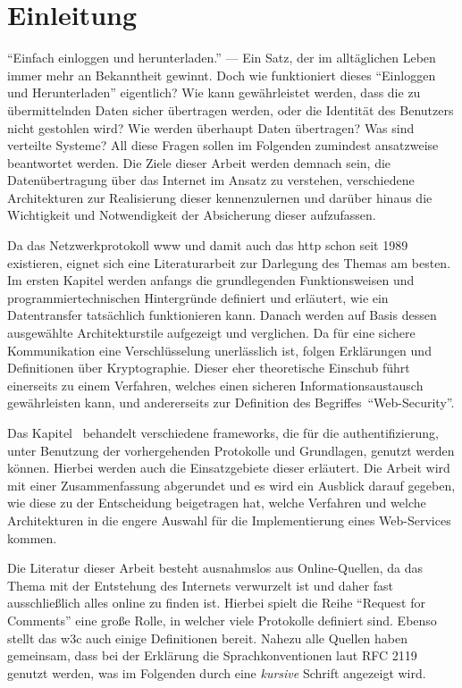 \section{Einleitung}\label{sec:einleitung}

	\enquote{Einfach einloggen und herunterladen.}
	--- Ein Satz, der im alltäglichen Leben immer mehr an Bekanntheit gewinnt.
	Doch wie funktioniert dieses \enquote{Einloggen und Herunterladen} eigentlich?
	Wie kann gewährleistet werden,
	dass die zu übermittelnden Daten sicher übertragen werden,
	oder die Identität des Benutzers nicht gestohlen wird?
	Wie werden überhaupt Daten übertragen?
	Was sind verteilte Systeme?
	All diese Fragen sollen im Folgenden zumindest ansatzweise beantwortet werden.
	Die Ziele dieser Arbeit werden demnach sein,
	die Datenübertragung über das Internet im Ansatz zu verstehen,
	verschiedene Architekturen zur Realisierung dieser kennenzulernen
	und darüber hinaus die Wichtigkeit und Notwendigkeit der Absicherung dieser aufzufassen.

	Da das Netzwerkprotokoll \gls{www} und damit auch das \gls{http} schon seit 1989 existieren,
	eignet sich eine Literaturarbeit zur Darlegung des Themas am besten.
	Im ersten Kapitel werden anfangs die grundlegenden Funktionsweisen
	und programmiertechnischen Hintergründe definiert
	und erläutert,
	wie ein Datentransfer tatsächlich funktionieren kann.
	Danach werden auf Basis dessen ausgewählte Architekturstile aufgezeigt und verglichen.
	Da für eine sichere Kommunikation eine Verschlüsselung unerlässlich ist,
	folgen Erklärungen und Definitionen über Kryptographie.
	Dieser eher theoretische Einschub führt einerseits zu einem Verfahren,
	welches einen sicheren Informationsaustausch gewährleisten kann,
	und andererseits zur Definition des Begriffes~\enquote{Web-Security}.

	Das Kapitel~ behandelt verschiedene \glspl{framework},
	die für die \gls{authentifizierung},
	unter Benutzung der vorhergehenden Protokolle und Grundlagen,
	genutzt werden können.
	Hierbei werden auch die Einsatzgebiete dieser erläutert.
	Die Arbeit wird mit einer Zusammenfassung abgerundet und es wird ein Ausblick darauf gegeben,
	wie diese zu der Entscheidung beigetragen hat,
	welche Verfahren und welche Architekturen in die engere Auswahl
	für die Implementierung eines Web-Services kommen.

	Die Literatur dieser Arbeit besteht ausnahmslos aus Online-Quellen,
	da das Thema mit der Entstehung des Internets verwurzelt ist
	und daher fast ausschließlich alles online zu finden ist.
	Hierbei spielt die Reihe \enquote{Request for Comments} eine große Rolle,
	in welcher viele Protokolle definiert sind.
	Ebenso stellt das \gls{w3c} auch einige Definitionen bereit.
	Nahezu alle Quellen haben gemeinsam,
	dass bei der Erklärung die Sprachkonventionen laut RFC 2119~\cite{rfc2119} genutzt werden,
	was im Folgenden durch eine \textit{kursive} Schrift angezeigt wird.
